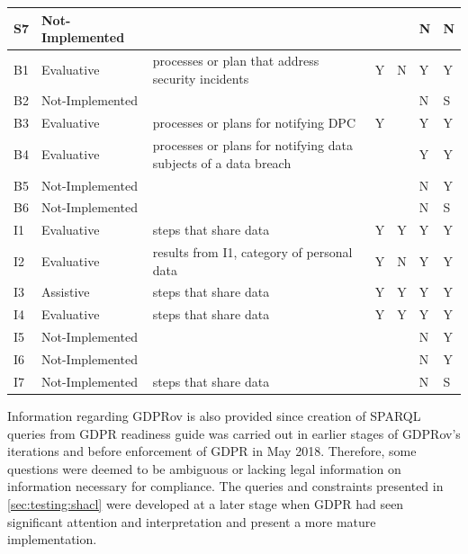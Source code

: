 \begin{center}
\begin{tabularx}{\textwidth}{|l|l|X|l|l|l|l|}
S7 & Not-Implemented &  &  &  & N & N \\ \hline
B1 & Evaluative & processes or plan that address security incidents & Y & N & Y & Y \\ \hline
B2 & Not-Implemented &  &  &  & N & S \\ \hline
B3 & Evaluative & processes or plans for notifying DPC & Y &  & Y & Y \\ \hline
B4 & Evaluative & processes or plans for notifying data subjects of a data breach &  &  & Y & Y \\ \hline
B5 & Not-Implemented &  &  &  & N & Y \\ \hline
B6 & Not-Implemented &  &  &  & N & S \\ \hline
I1 & Evaluative & steps that share data & Y & Y & Y & Y \\ \hline
I2 & Evaluative & results from I1, category of personal data & Y & N & Y & Y \\ \hline
I3 & Assistive & steps that share data & Y & Y & Y & Y \\ \hline
I4 & Evaluative & steps that share data & Y & Y & Y & Y \\ \hline
I5 & Not-Implemented &  &  &  & N & Y \\ \hline
I6 & Not-Implemented &  &  &  & N & Y \\ \hline
I7 & Not-Implemented & steps that share data &  &  & N & S \\ \hline
\end{tabularx}
\end{center}

Information regarding GDPRov is also provided since creation of SPARQL queries from GDPR readiness guide was carried out in earlier stages of GDPRov's iterations and before enforcement of GDPR in May 2018. Therefore, some questions were deemed to be ambiguous or lacking legal information on information necessary for compliance.
The queries and constraints presented in \autoref{sec:testing:shacl} were developed at a later stage when GDPR had seen significant attention and interpretation and present a more mature implementation.

